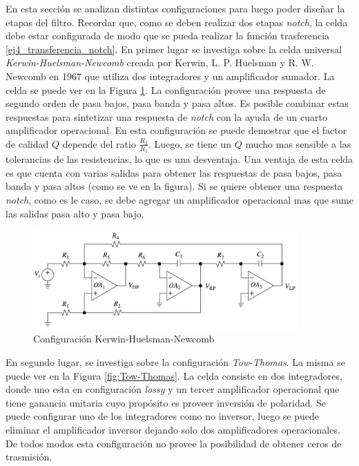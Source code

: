 En esta sección se analizan distintas configuraciones para luego poder diseñar la etapas del filtro. Recordar que, como se deben realizar dos etapas \textit{notch}, la celda debe estar configurada de modo que se pueda realizar la función trasferencia \ref{ej4_transferencia_notch}. En primer lugar se investiga sobre la celda universal \textit{Kerwin-Huelsman-Newcomb} creada por Kerwin, L. P. Huelsman y R. W. Newcomb en 1967 que utiliza dos integradores y un amplificador sumador. La celda se puede ver en la Figura \ref{fig:Kerwin-Huelsman-Newcomb}. La configuración provee una respuesta de segundo orden de pasa bajos, pasa banda y pasa altos. Es posible combinar estas respuestas para sintetizar una respuesta de \textit{notch} con la ayuda de un cuarto amplificador operacional. En esta configuración se puede demostrar que el factor de calidad $Q$ depende del ratio $\frac{R_2}{R_1}$. Luego, se tiene un $Q$ mucho mas sensible a las tolerancias de las resistencias, lo que es una desventaja. Una ventaja de esta celda es que cuenta con varias salidas para obtener las respuestas de pasa bajos, pasa banda y pasa altos (como se ve en la figura). Si se quiere obtener una respuesta \textit{notch}, como es le caso, se debe agregar un amplificador operacional mas que sume las salidas pasa alto y pasa bajo.

\begin{figure}[h!]                                                       
    \centering\includegraphics[width=0.9\textwidth]{../Ex4/Resources/Kerwin_Huelsman_Newcomb.png}
    \caption{Configuración Kerwin-Huelsman-Newcomb}
    \label{fig:Kerwin-Huelsman-Newcomb}
    \end{figure}

En segundo lugar, se investiga sobre la configuración \textit{Tow-Thomas}. La misma se puede ver en la Figura \ref{fig:Tow-Thomas}. La celda consiste en dos integradores, donde uno esta en configuración \textit{lossy} y un tercer amplificador operacional que tiene ganancia unitaria cuyo propósito es proveer inversión de polaridad. Se puede configurar uno de los integradores como no inversor, luego se puede eliminar el amplificador inversor dejando solo dos amplificadores operacionales. De todos modos esta configuración no provee la posibilidad de obtener ceros de trasmisión.   

